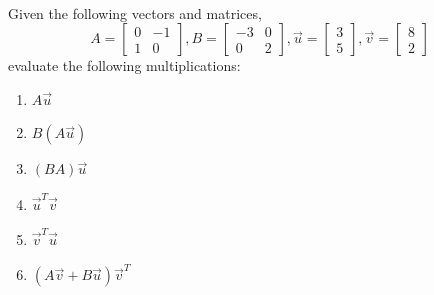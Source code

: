   \begin{exercise}\mbox{}\\
  Given the following vectors and matrices,
    $$A = \begin{bmatrix} 0 & -1 \\ 1 & 0 \end{bmatrix}, B= \begin{bmatrix}-3 & 0 \\ 0 & 2 \end{bmatrix}, \vec{u} = \begin{bmatrix}3 \\ 5\end{bmatrix}, \vec{v} = \begin{bmatrix}8 \\ 2\end{bmatrix}$$
    evaluate the following multiplications:
    \begin{enumerate}[label=\alph*.]
      \item $A\vec u$
      \item $B(A\vec u)$
      \item $(BA)\vec u$
      \item $\vec u^T \vec v$
      \item $\vec v^T \vec u$
      \item $(A \vec v + B \vec u)\vec v^T$
    \end{enumerate}
  \end{exercise}


